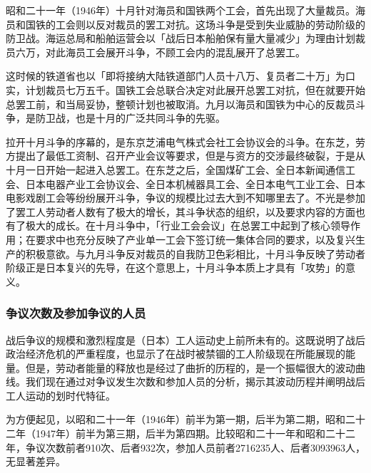 \documentclass[a4paper,12pt]{article}
\begin{document}
昭和二十一年（1946年）十月针对海员和国铁两个工会，首先出现了大量裁员。海员和国铁的工会则以反对裁员的罢工对抗。这场斗争是受到失业威胁的劳动阶级的防卫战。海运总局和船舶运营会以「战后日本船舶保有量大量减少」为理由计划裁员六万，对此海员工会展开斗争，不顾工会内的混乱展开了总罢工。

这时候的铁道省也以「即将接纳大陆铁道部门人员十八万、复员者二十万」为口实，计划裁员七万五千。国铁工会总联合决定对此展开总罢工对抗，但在就要开始总罢工前，和当局妥协，整顿计划也被取消。九月以海员和国铁为中心的反裁员斗争，是防卫战，也是十月的广泛共同斗争的先驱。

拉开十月斗争的序幕的，是东京芝浦电气株式会社工会协议会的斗争。在东芝，劳方提出了最低工资制、召开产业会议等要求，但是与资方的交涉最终破裂，于是从十月一日开始一起进入总罢工。在东芝之后，全国煤矿工会、全日本新闻通信工会、日本电器产业工会协议会、全日本机械器具工会、全日本电气工业工会、日本电影戏剧工会等纷纷展开斗争，争议的规模比过去大到不知哪里去了。不光是参加了罢工人劳动者人数有了极大的增长，其斗争状态的组织，以及要求内容的方面也有了极大的成长。在十月斗争中，「行业工会会议」在总罢工中起到了核心领导作用；在要求中也充分反映了产业单一工会下签订统一集体合同的要求，以及复兴生产的积极意欲。与九月斗争反对裁员的自我防卫色彩相比，十月斗争反映了劳动者阶级正是日本复兴的先导，在这个意思上，十月斗争本质上才具有「攻势」的意义。

\subsubsection{争议次数及参加争议的人员}

战后争议的规模和激烈程度是（日本）工人运动史上前所未有的。这既说明了战后政治经济危机的严重程度，也显示了在战时被禁锢的工人阶级现在所能展现的能量。但是，劳动者能量的释放也是经过了曲折的历程的，是一个振幅很大的波动曲线。我们现在通过对争议发生次数和参加人员的分析，揭示其波动历程并阐明战后工人运动的划时代特征。

为方便起见，以昭和二十一年（1946年）前半为第一期，后半为第二期，昭和二十二年（1947年）前半为第三期，后半为第四期。比较昭和二十一年和昭和二十二年，争议次数前者910次、后者932次，参加人员前者2716235人、后者3093963人，无显著差异。
\end{document}

